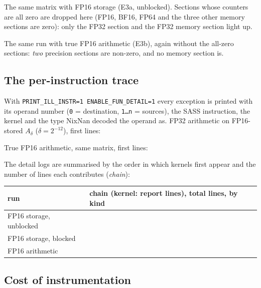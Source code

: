 \documentclass[11pt,a4paper]{article}
\begin{document}
The same matrix with FP16 storage (E3a, unblocked). Sections whose counters are all zero are dropped here (FP16, BF16, FP64 and the three other memory sections are zero): only the FP32 section and the FP32 memory section light up.



\noindent The same run with true FP16 arithmetic (E3b), again without the all-zero sections: \emph{two} precision sections are non-zero, and no memory section is.



\subsection{The per-instruction trace}

With \texttt{PRINT\_ILL\_INSTR=1 ENABLE\_FUN\_DETAIL=1} every exception is printed with its operand number
(\texttt{0} = destination, \texttt{1\ldots n} = sources), the SASS instruction, the kernel and the type NixNan decoded the operand as. FP32 arithmetic on FP16-stored $A_\delta$ ($\delta=2^{-12}$), first lines:



True FP16 arithmetic, same matrix, first lines:



The detail logs are summarised by the order in which kernels first appear and the number of lines each contributes (\emph{chain}):

\begin{center}\small
\begin{tabular}{lp{10.2cm}}
\toprule
run & chain (kernel: report lines), total lines, by kind\\
\midrule
FP16 storage, unblocked & \\
FP16 storage, blocked & \\
FP16 arithmetic & \\
\bottomrule
\end{tabular}
\end{center}

\subsection{Cost of instrumentation}
\end{document}
